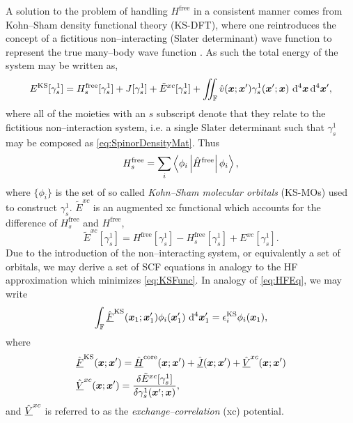 A solution to the problem of handling $H^\mathrm{free}$ in a consistent manner
comes from Kohn--Sham density functional theory (KS-DFT), where one
reintroduces the concept of a fictitious non--interacting (Slater determinant)
wave function to represent the true many--body wave function . As
such the total energy of the system may be written as,
\begin{equation}
  \label{eq:KSFunc}
  E^{\mathrm{KS}}[\gamma_s^1] = H_s^\mathrm{free}[\gamma_s^1] + J[\gamma_s^1] + \tilde E^{xc}[\gamma_s^1] + 
    \int\mkern-12mu\int_\mathbb{F} \hat{v}(\boldsymbol{x};\boldsymbol{x}') \gamma_s^1(\boldsymbol{x}'; \boldsymbol{x})\, \,\mathrm{d}^4\boldsymbol{x}\,\mathrm{d}^4\boldsymbol{x}',
\end{equation}
where all of the moieties with an $s$ subscript denote that they relate to the
fictitious non--interaction system, i.e. a single Slater determinant such that
$\gamma^1_s$ may be composed as \cref{eq:SpinorDensityMat}. Thus
\begin{equation}
  H^\mathrm{free}_s = \sum_i \left\langle \phi_i \left\vert \hat{H}^\mathrm{free} \right\vert \phi_i \right\rangle,
\end{equation}
where $\{\phi_i\}$ is the set of so called \emph{Kohn--Sham molecular orbitals} (KS-MOs) used to construct $\gamma^1_s$.
$\tilde E^{xc}$ is an augmented xc functional which accounts for the difference
of $H_s^\mathrm{free}$ and $H^\mathrm{free}$,
\begin{equation}
  \label{eq:KSXC_func}
  \tilde E^{xc}[\gamma^1_s] = H^\mathrm{free}[\gamma^1_s] - H_s^\mathrm{free}[\gamma^1_s] + E^{xc}[\gamma^1_s].
\end{equation}
Due to the introduction of the non--interacting system, or equivalently a set of orbitals,
we may derive a set of SCF equations in analogy to the HF approximation which minimizes \cref{eq:KSFunc}.
In analogy of \cref{eq:HFEq}, we may write
\begin{equation}
  \label{eq:KSEqCan}
  \int_{\mathbb F} \hat{\underline{F}}^{\mathrm{KS}}(\boldsymbol{x}_1; \boldsymbol{x}_1') \phi_i(\boldsymbol{x}_1') \,\,\mathrm{d}^4\boldsymbol{x}'_1 = 
    \epsilon^{\mathrm{KS}}_i \phi_i(\boldsymbol{x}_1), 
\end{equation}
where
\begin{align}
  \label{eq:KSFockSpace}
  &\hat{\underline{F}}^{\mathrm{KS}}(\boldsymbol{x}; \boldsymbol{x}') = 
    \hat{\underline{H}}^\mathrm{core}(\boldsymbol{x}; \boldsymbol{x}') + \hat{\underline{J}}(\boldsymbol{x}; \boldsymbol{x}') +
    \hat{\underline{V}}^{xc}(\boldsymbol{x}; \boldsymbol{x}') \\
  &\hat{\underline{V}}^{xc}(\boldsymbol{x}; \boldsymbol{x}') = \frac{\delta \tilde E^{xc}[\gamma^1_s]}{\delta \gamma^1_s(\boldsymbol{x}';\boldsymbol{x})},
\end{align}
and $\hat{\underline{V}}^{xc}$ is referred to as the \emph{exchange--correlation} (xc) potential. 
